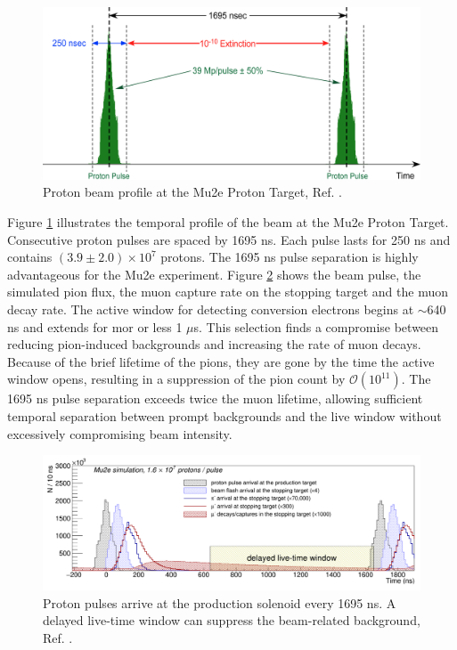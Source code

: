 \begin{figure}[!h]
\centering
\includegraphics[width =\textwidth]{figures/png/Screenshot_20240301_151148.png}
\caption{Proton beam profile at the Mu2e Proton Target, Ref. \cite{accelerator}.}
\label{fig:beamprofile}
\end{figure}
Figure \ref{fig:beamprofile} illustrates the temporal profile of the beam at the Mu2e Proton Target. Consecutive proton pulses are spaced by 1695 ns. Each pulse lasts for 250 ns and contains $(3.9 \pm 2.0 )\times 10^7$ protons. The 1695 ns pulse separation is highly advantageous for the Mu2e experiment. Figure \ref{fig:beamwindow} shows the beam pulse, the simulated pion flux, the muon capture rate on the stopping target and the muon decay rate. The active window for detecting conversion electrons begins at $\sim$640 ns and extends for mor or less 1 $\mu$s. This selection finds a compromise between reducing pion-induced backgrounds  and increasing the rate of muon decays. Because of the brief lifetime of the pions, they are gone by the time the active window opens, resulting in a suppression of the pion count by $\mathcal{O}(10^{11})$. The 1695 ns pulse separation exceeds twice the muon lifetime, allowing sufficient temporal separation between prompt backgrounds and the live window without excessively compromising beam intensity.
\begin{figure}[!h]
\centering
\includegraphics[width =\textwidth]{figures/png/Screenshot_20240301_164649.png}
\caption{Proton pulses arrive at the production solenoid every 1695 ns. A delayed live-time window can suppress the beam-related background, Ref. \cite{universe9010054}.}
\label{fig:beamwindow}
\end{figure}
